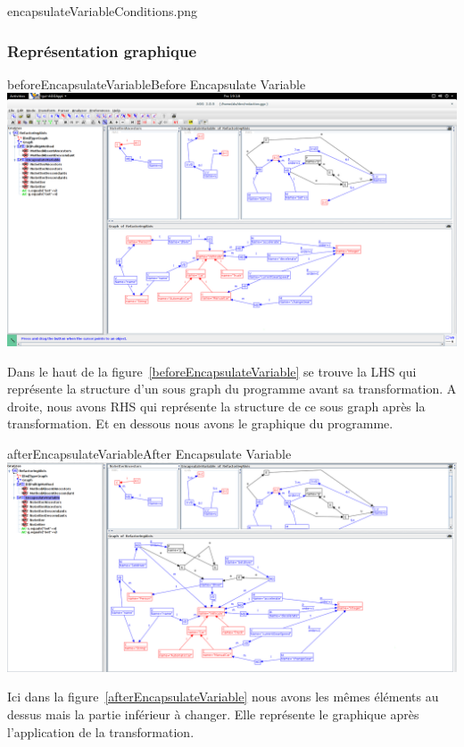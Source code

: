 \documentclass[a4paper, 10pt]{article}
\begin{document}
encapsulateVariableConditions.png

\subsubsection{Représentation graphique}

\begin{myfig}{beforeEncapsulateVariable}{Before Encapsulate Variable}
\includegraphics[width=\textwidth]{beforeEncapsulateVariable.png}
\end{myfig}

Dans le haut de la figure~\ref{beforeEncapsulateVariable} se trouve la LHS qui représente la structure d'un sous graph du programme avant sa transformation. A droite, nous avons RHS qui représente la structure de ce sous graph après la transformation. Et en dessous nous avons le graphique du programme.

\begin{myfig}{afterEncapsulateVariable}{After Encapsulate Variable}
\includegraphics[width=\textwidth]{afterEncapsulateVariable.png}
\end{myfig}

Ici dans la figure~\ref{afterEncapsulateVariable} nous avons les mêmes éléments au dessus mais la partie inférieur à changer. 
Elle représente le graphique après l'application de la transformation.
\end{document}
